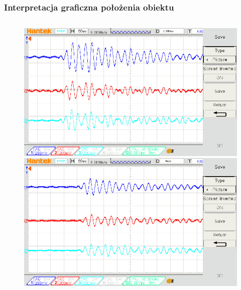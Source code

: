 \documentclass[xcolor=dvipsnames]{beamer}%
\begin{document}
\begin{frame}
	\frametitle{Interpretacja graficzna położenia obiektu}
	\begin{columns}
		\begin{column}{0.49\textwidth}
			\begin{figure}
				\includegraphics[width=\textwidth]{figure/dso_01_25_06_58_07.jpg}
				\includegraphics[width=\textwidth]{figure/dso_01_25_07_00_00.jpg}
			\end{figure}		
		\end{column}


\end{columns}
\end{frame}
\end{document}
